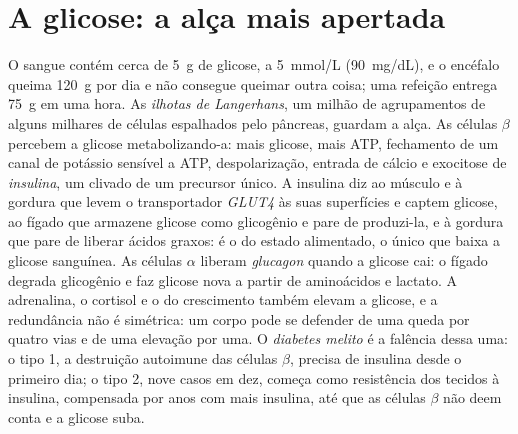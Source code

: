 \section{A glicose: a alça mais apertada}

\begin{definition}\label{def:b3:endocrinology:glucose}
O sangue contém cerca de \qty{5}{g} de glicose, a \qty{5}{mmol/L}
(\qty{90}{mg/dL}), e o encéfalo queima \qty{120}{g} por dia e não
consegue queimar outra coisa; uma refeição entrega \qty{75}{g} em uma
hora. As \emph{ilhotas de Langerhans}, um milhão de agrupamentos de
alguns milhares de células espalhados pelo pâncreas, guardam a alça. As
células $\beta$ percebem a glicose metabolizando-a: mais glicose, mais
ATP, fechamento de um canal de potássio sensível a ATP, despolarização,
entrada de cálcio e exocitose de \emph{insulina}, um 
clivado de um precursor único. A insulina diz ao músculo e à gordura que
levem o transportador \emph{GLUT4} às suas superfícies e captem glicose,
ao fígado que armazene glicose como glicogênio e pare de produzi-la, e à
gordura que pare de liberar ácidos graxos: é o  do estado
alimentado, o único que baixa a glicose sanguínea. As células $\alpha$
liberam \emph{glucagon} quando a glicose cai: o fígado degrada glicogênio
e faz glicose nova a partir de aminoácidos e lactato. A adrenalina, o
cortisol e o  do crescimento também elevam a glicose, e a
redundância não é simétrica: um corpo pode se defender de uma queda por
quatro vias e de uma elevação por uma. O \emph{diabetes melito} é a
falência dessa uma: o tipo 1, a destruição autoimune das células $\beta$,
precisa de insulina desde o primeiro dia; o tipo 2, nove casos em dez,
começa como resistência dos tecidos à insulina, compensada por anos com
mais insulina, até que as células $\beta$ não deem conta e a glicose
suba.
\end{definition}

